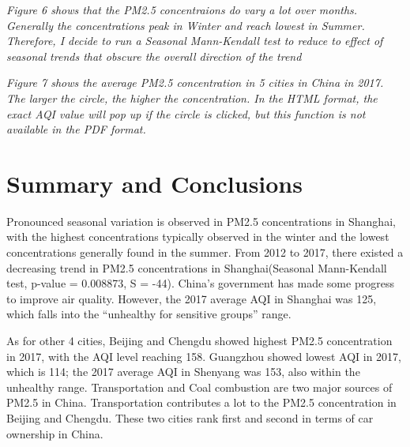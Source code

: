 \documentclass[12pt,]{article}
\begin{document}
\emph{Figure 6 shows that the PM2.5 concentraions do vary a lot over
months. Generally the concentrations peak in Winter and reach lowest in
Summer. Therefore, I decide to run a Seasonal Mann-Kendall test to
reduce to effect of seasonal trends that obscure the overall direction
of the trend}

\emph{Figure 7 shows the average PM2.5 concentration in 5 cities in
China in 2017. The larger the circle, the higher the concentration. In
the HTML format, the exact AQI value will pop up if the circle is
clicked, but this function is not available in the PDF format.} \newpage

\section{Summary and Conclusions}\label{summary-and-conclusions}

Pronounced seasonal variation is observed in PM2.5 concentrations in
Shanghai, with the highest concentrations typically observed in the
winter and the lowest concentrations generally found in the summer. From
2012 to 2017, there existed a decreasing trend in PM2.5 concentrations
in Shanghai(Seasonal Mann-Kendall test, p-value = 0.008873, S = -44).
China's government has made some progress to improve air quality.
However, the 2017 average AQI in Shanghai was 125, which falls into the
``unhealthy for sensitive groups'' range.

As for other 4 cities, Beijing and Chengdu showed highest PM2.5
concentration in 2017, with the AQI level reaching 158. Guangzhou showed
lowest AQI in 2017, which is 114; the 2017 average AQI in Shenyang was
153, also within the unhealthy range. Transportation and Coal combustion
are two major sources of PM2.5 in China. Transportation contributes a
lot to the PM2.5 concentration in Beijing and Chengdu. These two cities
rank first and second in terms of car ownership in China.
\end{document}
